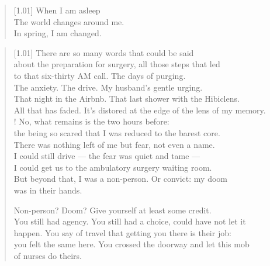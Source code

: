 \null
\vfill
\begin{verse}[1.01\textwidth]
  When I am asleep\\
  The world changes around me.\\
  In spring, I am changed.
\end{verse}
\vfill
\newpage

\begin{verse}[1.01\textwidth]
  There are so many words that could be said\\
  about the preparation for surgery, all those steps that led\\
  to that six-thirty AM call. The days of purging.\\
  The anxiety. The drive. My husband's gentle urging.\\
  That night in the Airbnb. That last shower with the Hibiclens.\\
  All that has faded. It's distored at the edge of the lens
  of my memory.\\!
   No, what remains is the two hours before:\\
  the being so scared that I was reduced to the barest core.\\
  There was nothing left of me but fear, not even a name.\\
  I could still drive --- the fear was quiet and tame ---\\
  I could get us to the ambulatory surgery waiting room.\\
  But beyond that, I was a non-person. Or convict: my doom\\
  was in their hands.

  \begin{ally}
  \noindent Non-person? Doom? Give yourself at least some credit.\\
  \noindent You still had agency. You still had a choice, could have not let it\\
  \noindent happen. You say of travel that getting you there is their job:\\
  \noindent you felt the same here. You crossed the doorway and let this mob\\
  \noindent of nurses do theirs.
\end{ally}


\end{verse}
